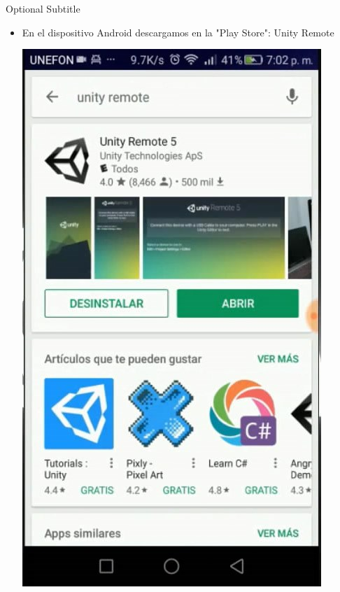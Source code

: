 \documentclass{beamer}
\begin{document}
\begin{frame}{05}{Optional Subtitle}
  \begin{itemize}
  \item {
    En el dispositivo Android descargamos en la "Play Store":
    Unity Remote
  }
  
  \includegraphics[height=0.7\paperheight]{image2/UR05}
  \centering
  \end{itemize}
\end{frame}
\end{document}
